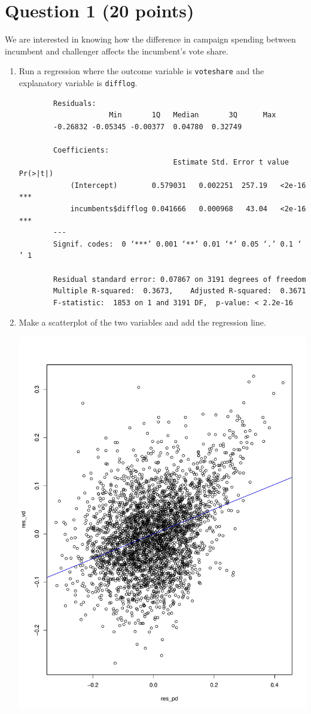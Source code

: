 \documentclass[12pt,letterpaper]{article}
\begin{document}
\section*{Question 1 (20 points)}
\vspace{.25cm}
\noindent We are interested in knowing how the difference in campaign spending between incumbent and challenger affects the incumbent's vote share. 
	\begin{enumerate}
		\item Run a regression where the outcome variable is \texttt{voteshare} and the explanatory variable is \texttt{difflog}.	\vspace{5cm}
		 
		\begin{verbatim}
		Residuals:
    				 Min       1Q   Median       3Q      Max 
		-0.26832 -0.05345 -0.00377  0.04780  0.32749 

		Coefficients:
                   					Estimate Std. Error t value Pr(>|t|)    
			(Intercept)        0.579031   0.002251  257.19   <2e-16 ***
			incumbents$difflog 0.041666   0.000968   43.04   <2e-16 ***
		---
		Signif. codes:  0 ‘***’ 0.001 ‘**’ 0.01 ‘*’ 0.05 ‘.’ 0.1 ‘ ’ 1

		Residual standard error: 0.07867 on 3191 degrees of freedom
		Multiple R-squared:  0.3673,	Adjusted R-squared:  0.3671 
		F-statistic:  1853 on 1 and 3191 DF,  p-value: < 2.2e-16
		\end{verbatim}
	
		\item Make a scatterplot of the two variables and add the regression line.
		 
		\includegraphics[width=.75\textwidth]{plot_1.pdf} 
		

\end{enumerate}
\end{document}
